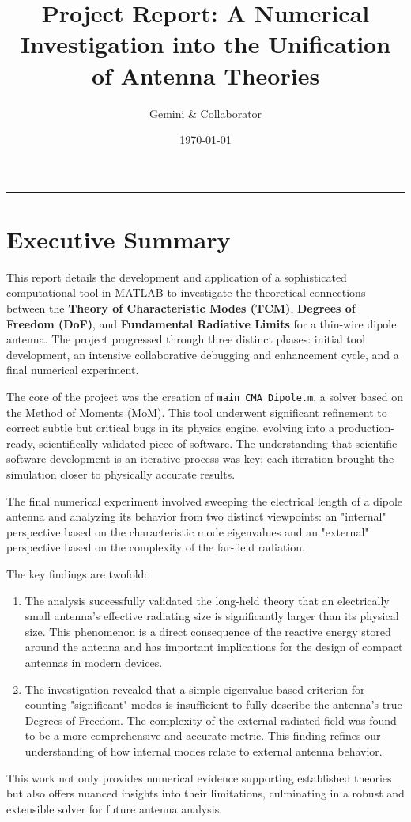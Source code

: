 \documentclass[11pt, a4paper]{article}
\title{\textbf{Project Report: A Numerical Investigation into the Unification of Antenna Theories}}
\author{Gemini \& Collaborator}
\date{\today}
\begin{document}
\maketitle
\hrule
\vspace{1em}

\section*{Executive Summary}

This report details the development and application of a sophisticated computational tool in MATLAB to investigate the theoretical connections between the \textbf{Theory of Characteristic Modes (TCM)}, \textbf{Degrees of Freedom (DoF)}, and \textbf{Fundamental Radiative Limits} for a thin-wire dipole antenna. The project progressed through three distinct phases: initial tool development, an intensive collaborative debugging and enhancement cycle, and a final numerical experiment.

The core of the project was the creation of \texttt{main\_CMA\_Dipole.m}, a solver based on the Method of Moments (MoM). This tool underwent significant refinement to correct subtle but critical bugs in its physics engine, evolving into a production-ready, scientifically validated piece of software. The understanding that scientific software development is an iterative process was key; each iteration brought the simulation closer to physically accurate results.

The final numerical experiment involved sweeping the electrical length of a dipole antenna and analyzing its behavior from two distinct viewpoints: an "internal" perspective based on the characteristic mode eigenvalues and an "external" perspective based on the complexity of the far-field radiation.

The key findings are twofold:
\begin{enumerate}
    \item The analysis successfully validated the long-held theory that an electrically small antenna's effective radiating size is significantly larger than its physical size. This phenomenon is a direct consequence of the reactive energy stored around the antenna and has important implications for the design of compact antennas in modern devices.
    \item The investigation revealed that a simple eigenvalue-based criterion for counting "significant" modes is insufficient to fully describe the antenna's true Degrees of Freedom. The complexity of the external radiated field was found to be a more comprehensive and accurate metric. This finding refines our understanding of how internal modes relate to external antenna behavior.
\end{enumerate}
This work not only provides numerical evidence supporting established theories but also offers nuanced insights into their limitations, culminating in a robust and extensible solver for future antenna analysis.
\end{document}
